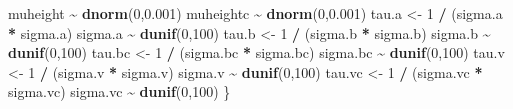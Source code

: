 \documentclass[
]{article}
\newenvironment{Shaded}{\begin{snugshade}}{\end{snugshade}}
\newcommand{\DecValTok}[1]{\textcolor[rgb]{0.00,0.00,0.81}{#1}}
\newcommand{\FloatTok}[1]{\textcolor[rgb]{0.00,0.00,0.81}{#1}}
\newcommand{\FunctionTok}[1]{\textcolor[rgb]{0.13,0.29,0.53}{\textbf{#1}}}
\newcommand{\NormalTok}[1]{#1}
\newcommand{\OtherTok}[1]{\textcolor[rgb]{0.56,0.35,0.01}{#1}}
\newcommand{\SpecialCharTok}[1]{\textcolor[rgb]{0.81,0.36,0.00}{\textbf{#1}}}
\begin{document}
\begin{Shaded}
\begin{Highlighting}[]
\NormalTok{muheight }\SpecialCharTok{\textasciitilde{}} \FunctionTok{dnorm}\NormalTok{(}\DecValTok{0}\NormalTok{,}\FloatTok{0.001}\NormalTok{)}
\NormalTok{muheightc }\SpecialCharTok{\textasciitilde{}} \FunctionTok{dnorm}\NormalTok{(}\DecValTok{0}\NormalTok{,}\FloatTok{0.001}\NormalTok{)}
\NormalTok{tau.a }\OtherTok{\textless{}{-}} \DecValTok{1} \SpecialCharTok{/}\NormalTok{ (sigma.a }\SpecialCharTok{*}\NormalTok{ sigma.a)}
\NormalTok{sigma.a }\SpecialCharTok{\textasciitilde{}} \FunctionTok{dunif}\NormalTok{(}\DecValTok{0}\NormalTok{,}\DecValTok{100}\NormalTok{)}
\NormalTok{tau.b }\OtherTok{\textless{}{-}} \DecValTok{1} \SpecialCharTok{/}\NormalTok{ (sigma.b }\SpecialCharTok{*}\NormalTok{ sigma.b)}
\NormalTok{sigma.b }\SpecialCharTok{\textasciitilde{}} \FunctionTok{dunif}\NormalTok{(}\DecValTok{0}\NormalTok{,}\DecValTok{100}\NormalTok{)}
\NormalTok{tau.bc }\OtherTok{\textless{}{-}} \DecValTok{1} \SpecialCharTok{/}\NormalTok{ (sigma.bc }\SpecialCharTok{*}\NormalTok{ sigma.bc)}
\NormalTok{sigma.bc }\SpecialCharTok{\textasciitilde{}} \FunctionTok{dunif}\NormalTok{(}\DecValTok{0}\NormalTok{,}\DecValTok{100}\NormalTok{)}
\NormalTok{tau.v }\OtherTok{\textless{}{-}} \DecValTok{1} \SpecialCharTok{/}\NormalTok{ (sigma.v }\SpecialCharTok{*}\NormalTok{ sigma.v)}
\NormalTok{sigma.v }\SpecialCharTok{\textasciitilde{}} \FunctionTok{dunif}\NormalTok{(}\DecValTok{0}\NormalTok{,}\DecValTok{100}\NormalTok{)}
\NormalTok{tau.vc }\OtherTok{\textless{}{-}} \DecValTok{1} \SpecialCharTok{/}\NormalTok{ (sigma.vc }\SpecialCharTok{*}\NormalTok{ sigma.vc)}
\NormalTok{sigma.vc }\SpecialCharTok{\textasciitilde{}} \FunctionTok{dunif}\NormalTok{(}\DecValTok{0}\NormalTok{,}\DecValTok{100}\NormalTok{)}
\NormalTok{\}}


\end{Highlighting}
\end{Shaded}
\end{document}
